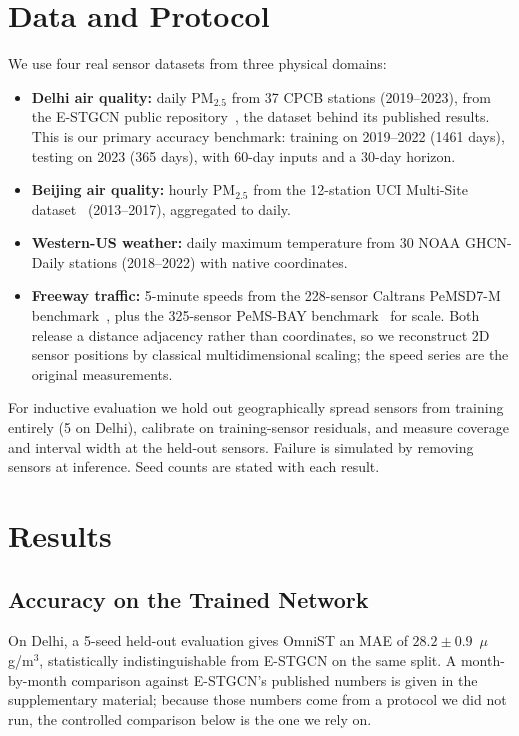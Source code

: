 \documentclass[journal]{IEEEtran}
\begin{document}
\section{Data and Protocol}
\label{sec:experiments}

We use four real sensor datasets from three physical domains:
\begin{itemize}
\item \textbf{Delhi air quality:} daily PM$_{2.5}$ from 37 CPCB stations (2019--2023), from the
E-STGCN public repository~\cite{panja2026estgcn}, the dataset behind its published results. This is
our primary accuracy benchmark: training on 2019--2022 (1461 days), testing on 2023 (365 days), with
60-day inputs and a 30-day horizon.
\item \textbf{Beijing air quality:} hourly PM$_{2.5}$ from the 12-station UCI Multi-Site
dataset~\cite{zhang2017beijingair} (2013--2017), aggregated to daily.
\item \textbf{Western-US weather:} daily maximum temperature from 30 NOAA GHCN-Daily stations
(2018--2022) with native coordinates.
\item \textbf{Freeway traffic:} 5-minute speeds from the 228-sensor Caltrans PeMSD7-M
benchmark~\cite{yu2018stgcn}, plus the 325-sensor PeMS-BAY benchmark~\cite{li2018dcrnn} for scale.
Both release a distance adjacency rather than coordinates, so we reconstruct 2D sensor positions by
classical multidimensional scaling; the speed series are the original measurements.
\end{itemize}

For inductive evaluation we hold out geographically spread sensors from training entirely (5 on
Delhi), calibrate on training-sensor residuals, and measure coverage and interval width at the
held-out sensors. Failure is simulated by removing sensors at inference. Seed counts are stated with
each result.

\section{Results}
\label{sec:results}

\subsection{Accuracy on the Trained Network}

On Delhi, a 5-seed held-out evaluation gives OmniST an MAE of $28.2\pm0.9$~$\mu$g/m$^3$, statistically
indistinguishable from E-STGCN on the same split. A month-by-month comparison against E-STGCN's
published numbers is given in the supplementary material; because those numbers come from a protocol
we did not run, the controlled comparison below is the one we rely on.
\end{document}
